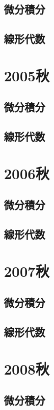\subsection{微分積分}


\subsection{線形代数}

\section{2005秋}
\subsection{微分積分}


\subsection{線形代数}

\section{2006秋}
\subsection{微分積分}


\subsection{線形代数}

\section{2007秋}
\subsection{微分積分}


\subsection{線形代数}

\section{2008秋}
\subsection{微分積分}


